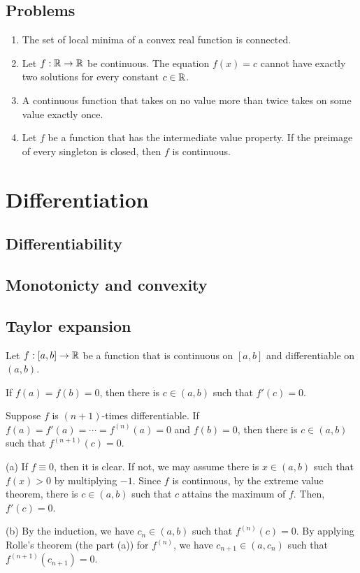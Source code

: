 \documentclass{../../large}
\begin{document}
\section*{Problems}
\begin{enumerate}
\item The set of local minima of a convex real function is connected.
\item Let $f:\mathbb{R}\to\mathbb{R}$ be continuous.
The equation $f(x)=c$ cannot have exactly two solutions for every constant $c\in\mathbb{R}$.
\item A continuous function that takes on no value more than twice takes on some value exactly once.
\item Let $f$ be a function that has the intermediate value property.
If the preimage of every singleton is closed, then $f$ is continuous.
\end{enumerate}







\chapter{Differentiation}
\section{Differentiability}
\begin{prb}
\end{prb}

\section{Monotonicty and convexity}

\section{Taylor expansion}
\begin{prb}
Let $f:[a,b]\to\mathbb{R}$ be a function that is continuous on $[a,b]$ and differentiable on $(a,b)$.
\begin{parts}
\item If $f(a)=f(b)=0$, then there is $c\in(a,b)$ such that $f'(c)=0$.
\item Suppose $f$ is $(n+1)$-times differentiable. If $f(a)=f'(a)=\cdots=f^{(n)}(a)=0$ and $f(b)=0$, then there is $c\in(a,b)$ such that $f^{(n+1)}(c)=0$.
\end{parts}
\end{prb}
\begin{pf}
(a)
If $f\equiv0$, then it is clear.
If not, we may assume there is $x\in(a,b)$ such that $f(x)>0$ by multiplying $-1$.
Since $f$ is continuous, by the extreme value theorem, there is $c\in(a,b)$ such that $c$ attains the maximum of $f$.
Then, $f'(c)=0$.

(b)
By the induction, we have $c_n\in(a,b)$ such that $f^{(n)}(c)=0$.
By applying Rolle's theorem (the part (a)) for $f^{(n)}$, we have $c_{n+1}\in(a,c_n)$ such that $f^{(n+1)}(c_{n+1})=0$.
\end{pf}
\end{document}
